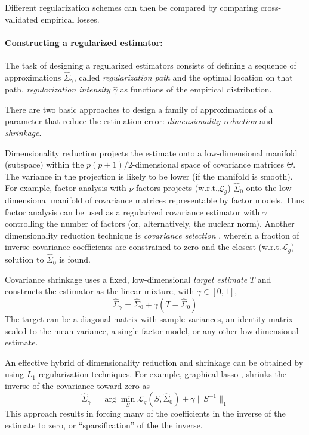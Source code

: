 Different regularization schemes can then be compared by comparing cross-validated empirical losses.

 
\paragraph{Constructing a regularized estimator:}
The task of designing a regularized estimators consists of defining a sequence of approximations $\hat\Sigma_\gamma$, called \emph{regularization path} and the optimal location on that path, \emph{regularization intensity} $\hat\gamma$ as  functions of the empirical distribution. 

There are two basic approaches to design a family of approximations of a parameter that reduce the estimation error: \emph{dimensionality reduction} and \emph{shrinkage}.  

Dimensionality reduction projects the estimate onto a low-dimensional manifold (subspace) within the $p(p+1)/2$-dimensional space of covariance matrices $\Theta$.  The variance in the projection is likely to be lower (if the manifold is smooth).  For example, factor analysis with $\nu$ factors projects (w.r.t.\;$\mathcal L_g$) $\hat\Sigma_0$ onto the low-dimensional manifold of covariance matrices representable by factor models. Thus factor analysis can be used as a regularized covariance estimator \citep{Fan:2008} with $\gamma$ controlling the number of factors (or, alternatively, the nuclear norm).  Another dimensionality reduction technique is \emph{covariance selection} \citep{Dempster:1972}, wherein a fraction of inverse covariance coefficients are constrained to zero and the closest (w.r.t.\;$\mathcal L_g$) solution to $\hat\Sigma_0$ is found. 

Covariance shrinkage \citep{Schafer:2005,Ledoit:2004} uses a fixed, low-dimensional \emph{target estimate} $T$ and constructs the estimator as the linear mixture, with $\gamma \in [0,1]$,
\begin{equation}
\hat\Sigma_\gamma = \hat\Sigma_0  + \gamma (T-\hat\Sigma_0) 
\end{equation}
 The target can be a diagonal matrix with sample variances, an identity matrix scaled to the mean variance, a single factor model, or any other low-dimensional estimate.

An effective hybrid of dimensionality reduction and shrinkage can be obtained by using $L_1$-regularization techniques.  For example, graphical lasso \citep{Meinshausen:2006,Friedman:2008}, shrinks the inverse of the covariance toward zero as 
\begin{equation}
\hat\Sigma_\gamma = \arg\min\limits_S \mathcal L_g(S,\hat \Sigma_0) + \gamma \| S^{-1} \|_1
\end{equation}
This approach results in forcing many of the coefficients in the inverse of the estimate to zero, or ``sparsification'' of the the inverse.

